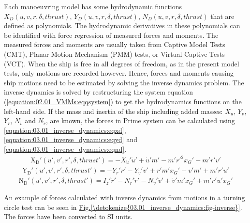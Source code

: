 \documentclass[review]{elsarticle}
\begin{document}
Each manoeuvring model has some hydrodynamic functions \(X_D(u,v,r,\delta,thrust)\), \(Y_D(u,v,r,\delta,thrust)\), \(N_D(u,v,r,\delta,thrust)\) that are defined as polynomials. The hydrodynamic derivatives in these polynomials can be identified with force regression of measured forces and moments. The measured forces and moments are usually taken from Captive Model Tests (CMT), Planar Motion Mechanism (PMM) tests, or Virtual Captive Tests (VCT).
When the ship is free in all degrees of freedom, as in the present model tests, only motions are recorded however. Hence, forces and moments causing ship motions need to be estimated by solving the inverse dynamics problem.
The inverse dynamics is solved by restructuring the system equation (\autoref{equation:02.01_VMMs:eqqsystem}) to get the hydrodynamics functions on the left-hand side. If the mass and inertia of the ship including added masses: \(X_{\dot{u}}\), \(Y_{\dot{v}}\), \(Y_{\dot{r}}\), \(N_{\dot{v}}\) and \(N_{\dot{r}}\), are known, the forces in Prime system can be calculated using \autoref{equation:03.01_inverse_dynamics:eqxd}, \autoref{equation:03.01_inverse_dynamics:eqyd} and \autoref{equation:03.01_inverse_dynamics:eqnd}.
\begin{equation}\label{equation:03.01_inverse_dynamics:eqxd}
\begin{split}\displaystyle \operatorname{X_{D}'}{\left(u',v',r',\delta,thrust' \right)} = - X_{\dot{u}}' \dot{u}' + \dot{u}' m' - m' r'^{2} x_{G}' - m' r' v'\end{split}
\end{equation}\begin{equation}\label{equation:03.01_inverse_dynamics:eqyd}
\begin{split}\displaystyle \operatorname{Y_{D}'}{\left(u',v',r',\delta,thrust' \right)} = - Y_{\dot{r}}' \dot{r}' - Y_{\dot{v}}' \dot{v}' + \dot{r}' m' x_{G}' + \dot{v}' m' + m' r' u'\end{split}
\end{equation}\begin{equation}\label{equation:03.01_inverse_dynamics:eqnd}
\begin{split}\displaystyle \operatorname{N_{D}'}{\left(u',v',r',\delta,thrust' \right)} = I_{z}' \dot{r}' - N_{\dot{r}}' \dot{r}' - N_{\dot{v}}' \dot{v}' + \dot{v}' m' x_{G}' + m' r' u' x_{G}'\end{split}
\end{equation}
  
An example of forces calculated with inverse dynamics from motions in a turning circle test can be seen in \hyperref[\detokenize{03.01_inverse_dynamics:fig-inverse}]{Fig.\@ \ref{\detokenize{03.01_inverse_dynamics:fig-inverse}}}. The forces have been converted to SI units.
\end{document}
